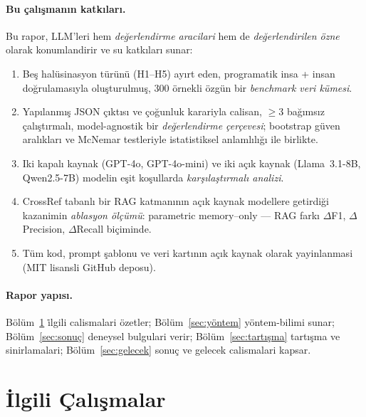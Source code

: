 \documentclass[11pt,a4paper]{article}
\begin{document}
\paragraph{Bu çalışmanın katkıları.}
Bu rapor, LLM'leri hem \emph{değerlendirme aracilari} hem de
\emph{değerlendirilen özne} olarak konumlandirir ve su katkıları sunar:

\begin{enumerate}[nosep]
\item Beş halüsinasyon türünü (H1--H5) ayırt eden, programatik insa + insan
doğrulamasıyla oluşturulmuş, 300 örnekli özgün bir \emph{benchmark veri
kümesi}.
\item Yapılanmış JSON çıktısı ve çoğunluk karariyla calisan, $\geq$3 bağımsız
çalıştırmalı, model-agnostik bir \emph{değerlendirme çerçevesi};
bootstrap güven aralıkları ve McNemar testleriyle istatistiksel anlamlılığı
ile birlikte.
\item Iki kapalı kaynak (GPT-4o, GPT-4o-mini) ve iki açık kaynak (Llama~3.1-8B,
Qwen2.5-7B) modelin eşit koşullarda \emph{karşılaştırmalı analizi}.
\item CrossRef tabanlı bir RAG katmanının açık kaynak modellere getirdiği
kazanimin \emph{ablasyon ölçümü}: parametric memory--only --- {} RAG farkı
$\Delta$F1, $\Delta$Precision, $\Delta$Recall biçiminde.
\item Tüm kod, prompt şablonu ve veri kartının açık kaynak olarak
yayinlanmasi (MIT lisansli GitHub deposu).
\end{enumerate}

\paragraph{Rapor yapısı.}
Bölüm~\ref{sec:related} i̇lgili calismalari özetler; Bölüm~\ref{sec:yöntem}
yöntem-bilimi sunar; Bölüm~\ref{sec:sonuç} deneysel bulgulari verir;
Bölüm~\ref{sec:tartışma} tartışma ve sinirlamalari; Bölüm~\ref{sec:gelecek}
sonuç ve gelecek calismalari kapsar.

\section{İlgili Çalışmalar}
\label{sec:related}
\end{document}
